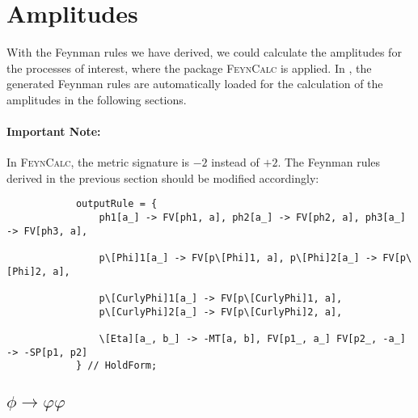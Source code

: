 \documentclass{article}
\begin{document}
    \section{Amplitudes}

        With the Feynman rules we have derived, we could calculate the amplitudes for the processes of interest, where the package \textsc{FeynCalc} \cite{Mertig:1990an, Shtabovenko:2016sxi, Shtabovenko:2020gxv, Shtabovenko:2023idz} is applied.
        In , the generated Feynman rules are automatically loaded for the calculation of the amplitudes in the following sections.

        \paragraph{Important Note:}
        In \textsc{FeynCalc}, the metric signature is $-2$ instead of $+2$.
        The Feynman rules derived in the previous section should be modified accordingly:
        \begin{verbatim}
            outputRule = {
                ph1[a_] -> FV[ph1, a], ph2[a_] -> FV[ph2, a], ph3[a_] -> FV[ph3, a],

                p\[Phi]1[a_] -> FV[p\[Phi]1, a], p\[Phi]2[a_] -> FV[p\[Phi]2, a],

                p\[CurlyPhi]1[a_] -> FV[p\[CurlyPhi]1, a],
                p\[CurlyPhi]2[a_] -> FV[p\[CurlyPhi]2, a],

                \[Eta][a_, b_] -> -MT[a, b], FV[p1_, a_] FV[p2_, -a_] -> -SP[p1, p2]
            } // HoldForm;
        \end{verbatim}

        \subsection{\boldmath \texorpdfstring{$\phi \to \varphi \varphi$}{inflaton → reheaton + reheaton}}
\end{document}
